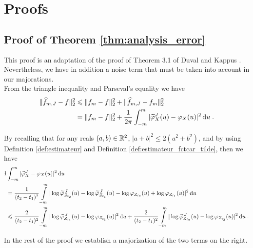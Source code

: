 \section{Proofs}
\label{sec:proof}
\subsection{Proof of Theorem \ref{thm:analysis_error}}

This proof is an adaptation of the proof of Theorem 3.1 of Duval and Kappus \cite{duval2019adaptive}. Nevertheless, we have in addition a noise term that must be taken into account in our majorations.\\


From the triangle inequality and Parseval's equality we have 
    \begin{subequations}
        \begin{align*}
            \lVert\widehat f_{m, J} - f\rVert_2^2
            &\leqslant \lVert f_m - f\rVert_2^2 + \lVert\widehat f_{m, J} - f_m\rVert_2^2 \\
            &= \lVert f_m - f\rVert_2^2 + \frac{1}{2\pi} \int_{-m}^m | \widetilde \varphi_X^J (u) - \varphi_X(u)|^2 \, \mathrm du
            \; .
        \end{align*}
    \end{subequations}

By recalling that for any reals $(a, b) \in \mathbb{R}^2$, $|a+b|^2 \leq 2 (a^2 + b^2)$, 
and by using Definition \ref{def:estimateur} and Definition \ref{def:estimateur_fctcar_tilde}, then we have
    \begin{subequations}
    \begin{align*}\l
         &\int_{-m}^m |\tilde \varphi_X^J  - \varphi_X(u)|^2 \du \notag{}\\
         &= \frac{1}{(t_2 - t_1)^2}\int\limits_{-m}^m 
        | \log \tilde \varphi_{Z_{t_2}}^{\, J}  (u) 
         - \log \tilde \varphi_{Z_{t_1}}^{\, J}  (u) 
         - \log\varphi_{Z_{t_2}} (u) + \log \varphi_{Z_{t_1}} (u)|^2 \du \\
         &\leq \frac{2}{(t_2 - t_1)^2}\int\limits_{-m}^m |\log \tilde \varphi_{Z_{t_1}}^{\, J} (u) - \log\varphi_{Z_{t_1}} (u)|^2 \du + \frac{2}{(t_2 - t_1)^2}\int\limits_{-m}^m | \log \tilde \varphi_{Z_{t_2}}^{\, J}  (u)  - \log\varphi_{Z_{t_2}} (u)|^2 \du 
\eqfinp
    \end{align*}
    \end{subequations}
    
In the rest of the proof we establish a majorization of the two terms on the right. \\

